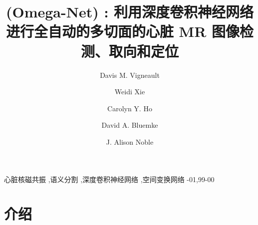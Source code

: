 \documentclass[final,5p]{elsarticle}
\newcommand\hl[1]{%
  \bgroup
  \hskip0pt\color{black!80!black}%
  #1%
  \egroup
}
\let\linenumbers\nolinenumbers\nolinenumbers
\begin{document}




\begin{frontmatter}

\title{\omeganet{} \hl{(Omega-Net)}: 利用深度卷积神经网络进行全自动的多切面的心脏 MR 图像检测、取向和定位}

\author[oxford,nih,tufts]{Davis M. Vigneault}

\author[oxford]{Weidi Xie}
\author[brigham]{Carolyn Y. Ho}
\author[wisc]{David A. Bluemke}
\author[oxford]{J. Alison Noble}

\address[oxford]{Institute of Biomedical Engineering, Department of Engineering, University of Oxford}
\address[nih]{Department of Radiology and Imaging Sciences, Clinical Center, National Institutes of Health}
\address[tufts]{Tufts University School of Medicine, Sackler School of Graduate Biomedical Sciences}
\address[brigham]{Cardiovascular Division, Brigham and Women's Hospital}
\address[wisc]{University of Wisconsin-Madison, School of Medicine and Public Health}


\begin{abstract}



\end{abstract}

\begin{keyword}
心脏核磁共振 \sep 语义分割 \sep 深度卷积神经网络 \sep 空间变换网络
-01\sep  99-00
\end{keyword}

\end{frontmatter}

\linenumbers

\newcommand{\figdir}{./figures/}
\newcommand{\tabdir}{./tables/}


\section{介绍} \label{introduction}


\end{document}
